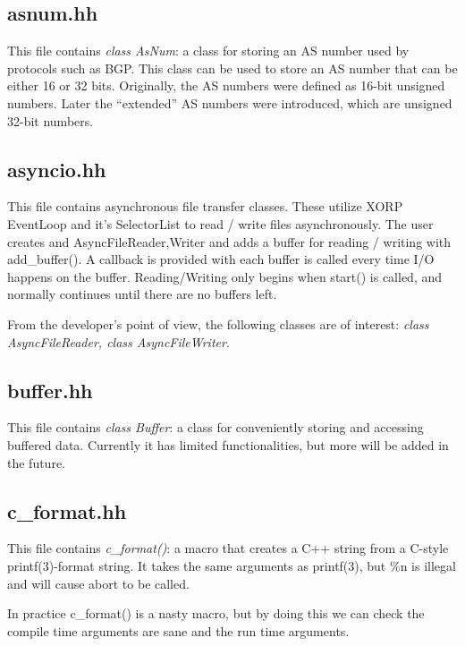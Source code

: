 \documentclass[11pt]{article}
\begin{document}
\subsection{asnum.hh}

This file contains \emph{class AsNum}: a class for storing an AS number
used by protocols such as BGP.
This class can be used to store an AS number that can be either
16 or 32 bits.  Originally, the AS numbers were defined as 16-bit
unsigned numbers.  Later the ``extended'' AS numbers were introduced,
which are unsigned 32-bit numbers.

\subsection{asyncio.hh}

This file contains 
asynchronous file transfer classes.  These utilize XORP EventLoop
and it's SelectorList to read / write files asynchronously.  The
user creates and AsyncFile{Reader,Writer} and adds a buffer for
reading / writing with add\_buffer().  A callback is provided with
each buffer is called every time I/O happens on the buffer.
Reading/Writing only begins when start() is called, and normally
continues until there are no buffers left.

From the developer's point of view, the following classes are of
interest: \emph{class AsyncFileReader, class AsyncFileWriter}.

\subsection{buffer.hh}

This file contains \emph{class Buffer}: a class for conveniently storing
and accessing buffered data.
Currently it has limited functionalities, but more will be added
in the future.


\subsection{c\_format.hh}

This file contains \emph{c\_format()}: a macro that creates a C++ string
from a C-style printf(3)-format string.
It takes the same arguments as printf(3), but \%n is illegal and
will cause abort to be called.

In practice c\_format() is a nasty macro, but by doing this we can check
the compile time arguments are sane and the run time arguments.
\end{document}
